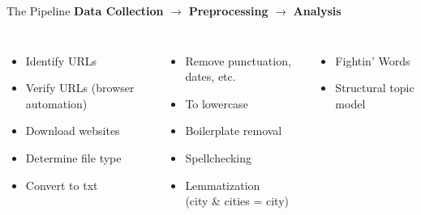 \documentclass[12pt]{beamer}
\begin{document}
\begin{frame}{The Pipeline}
	\textbf{Data Collection} \hspace{2mm} $\rightarrow$ \hspace{2mm} \textbf{Preprocessing} \hspace{2mm} $\rightarrow$ \hspace{2mm} \textbf{Analysis}
	\begin{columns}
		\vspace{5mm}
		\begin{itemize}
			\item Identify URLs
			\item Verify URLs (browser automation)
			\item Download websites
			\item Determine file type
			\item Convert to txt
		\end{itemize}		
		\vspace{5mm}
		\begin{itemize}
			\item Remove punctuation, dates, etc.
			\item To lowercase
			\item Boilerplate removal
			\item Spellchecking
			\item Lemmatization \\ (city \& cities = city)
		\end{itemize}
		\vspace{5mm}
		\begin{itemize}
			\item Fightin' Words
			\item Structural topic model
		\end{itemize}
	\end{columns}
\end{frame}

\end{document}
